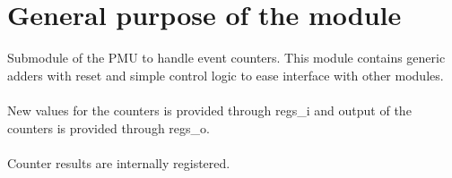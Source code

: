 \newpage
\section{General purpose of the module}

Submodule of the PMU to handle event counters. This module contains generic adders with reset and simple control logic to ease interface with other modules.\\
\\
New values for the counters is provided through regs\_i and output of the counters is provided  through regs\_o.\\
\\
Counter results are internally registered.

